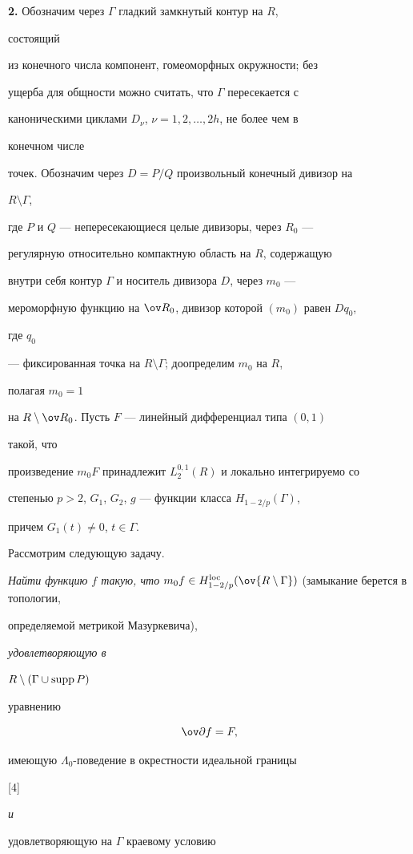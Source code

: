  


{\bf 2.} Обозначим через $\Gamma$ гладкий замкнутый контур на $R$, 


состоящий 


из конечного числа компонент, гомеоморфных окружности; без 


ущерба для общности можно считать, что $\Gamma$ пересекается с 


каноническими циклами $D_\nu$, $\nu=1,2,\dotsc,2h$, не более чем в 


конечном числе 


точек. Обозначим через $D=P/Q$ произвольный конечный дивизор на 


$R\setminus\Gamma$, 


где $P$ и $Q$ --- непересекающиеся целые дивизоры, через $R_0$ --- 


регулярную относительно компактную область на $R$, содержащую 


внутри себя контур $\Gamma$ и носитель дивизора $D$, через $m_0$ --- 


мероморфную функцию на $\ov R_0$, дивизор которой $(m_0)$ равен $D q_0$, 


где $q_0$ 


--- фиксированная точка на $R\setminus\Gamma$; доопределим $m_0$ на $R$, 


полагая $m_0=1$ 


на $R\setminus\ov R_0$. Пусть $F$ --- линейный дифференциал типа $(0,1)$ 


такой, что 


произведение $m_0F$ принадлежит $L^{0,1}_2(R)$ и локально интегрируемо со 


степенью $p>2$, $G_1$, $G_2$, $g$ --- функции класса $H_{1-2/p}(\Gamma)$, 


причем $G_1(t)\ne0$, $t\in\Gamma$. 


 


Рассмотрим следующую задачу. 


 


{\it Найти функцию $f$ такую, что} $m_0f\in 


H^{\loc}_{1-2/p}(\ov{R\setminus\Gamma})$ (замыкание берется в топологии, 


определяемой метрикой Мазуркевича), {\it удовлетворяющую в 


$R\setminus(\Gamma\cup\operatorname{supp} P)$ 


уравнению 


\begin{equation} 


\ov\partial f=F, 


\end{equation} 


имеющую $\Lambda_0$-поведение в окрестности идеальной границы} [4] {\it и 


удовлетворяющую на $\Gamma$ краевому условию} 


